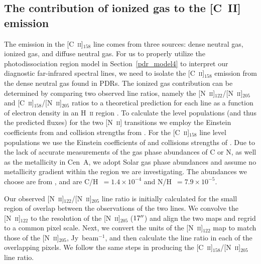\subsection{The contribution of ionized gas to the [C~{\footnotesize II}] emission}\label{ion_gas}
The emission in the [C~\textsc{ii}]$_{158}$ line comes from three sources: dense neutral gas, ionized gas, and diffuse neutral gas.  For us to properly utilize the photodissociation region model in Section~\ref{pdr_model4} to interpret our diagnostic far-infrared spectral lines, we need to isolate the [C~\textsc{ii}]$_{158}$ emission from the dense neutral gas found in PDRs.  The ionized gas contribution can be determined by comparing two observed line ratios, namely the [N~\textsc{ii}]$_{122}$/[N~\textsc{ii}]$_{205}$ and [C~\textsc{ii}]$_{158}$/[N~\textsc{ii}]$_{205}$ ratios to a theoretical prediction for each line as a function of electron density in an H~\textsc{ii} region \citep[e.g.][]{2006ApJ...652L.125O, parkin_2013}.  To calculate the level populations (and thus the predicted fluxes) for the two [N~\textsc{ii}] transitions we employ the Einstein coefficients from \citet{1997A&AS..123..159G} and collision strengths from \citet{2004MNRAS.348.1275H}.  For the [C~\textsc{ii}]$_{158}$ line level populations we use the Einstein coefficients of \citet{1998A&AS..131..499G} and collisions strengths of 
\citet{1992ApJS...80..425B}.  Due to the lack of accurate measurements of the gas phase abundances of C or N, as well as the metallicity in Cen~A, we adopt Solar gas phase abundances and assume no metallicity gradient within the region we are investigating.   The abundances we choose are from \citet{1996ARA&A..34..279S}, and are C/H~$= 1.4 \times 10^{-4}$ and N/H~$= 7.9 \times 10^{-5}$.



Our observed [N~\textsc{ii}]$_{122}$/[N~\textsc{ii}]$_{205}$ line ratio is initially calculated for the small region of overlap between the observations of the two lines.  We convolve the [N~\textsc{ii}]$_{122}$ to the resolution of the [N~\textsc{ii}]$_{205}$ ($17\mbox{$^{\prime\prime}$}$) and align the two maps and regrid to a common pixel scale.  Next, we convert the units of the [N~\textsc{ii}]$_{122}$ map to match those of the [N~\textsc{ii}]$_{205}$, Jy~beam$^{-1}$, and then calculate the line ratio in each of the overlapping pixels.  We follow the same steps in producing the [C~\textsc{ii}]$_{158}$/[N~\textsc{ii}]$_{205}$ line ratio.

